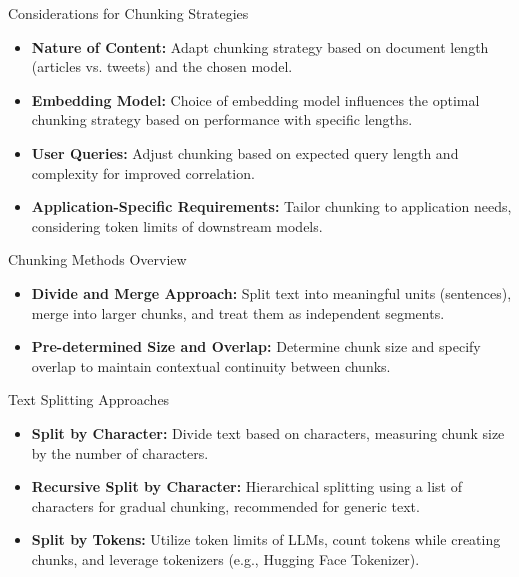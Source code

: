 \begin{frame}[fragile]{Considerations for Chunking Strategies}
  \begin{itemize}
    \item \textbf{Nature of Content:} Adapt chunking strategy based on document length (articles vs. tweets) and the chosen model.
    \item \textbf{Embedding Model:} Choice of embedding model influences the optimal chunking strategy based on performance with specific lengths.
    \item \textbf{User Queries:} Adjust chunking based on expected query length and complexity for improved correlation.
    \item \textbf{Application-Specific Requirements:} Tailor chunking to application needs, considering token limits of downstream models.
  \end{itemize}
\end{frame}

\begin{frame}[fragile]{Chunking Methods Overview}
  \begin{itemize}
    \item \textbf{Divide and Merge Approach:} Split text into meaningful units (sentences), merge into larger chunks, and treat them as independent segments.
    \item \textbf{Pre-determined Size and Overlap:} Determine chunk size and specify overlap to maintain contextual continuity between chunks.
  \end{itemize}
\end{frame}

\begin{frame}[fragile]{Text Splitting Approaches}
  \begin{itemize}
    \item \textbf{Split by Character:} Divide text based on characters, measuring chunk size by the number of characters.
    \item \textbf{Recursive Split by Character:} Hierarchical splitting using a list of characters for gradual chunking, recommended for generic text.
    \item \textbf{Split by Tokens:} Utilize token limits of LLMs, count tokens while creating chunks, and leverage tokenizers (e.g., Hugging Face Tokenizer).
  \end{itemize}
\end{frame}


